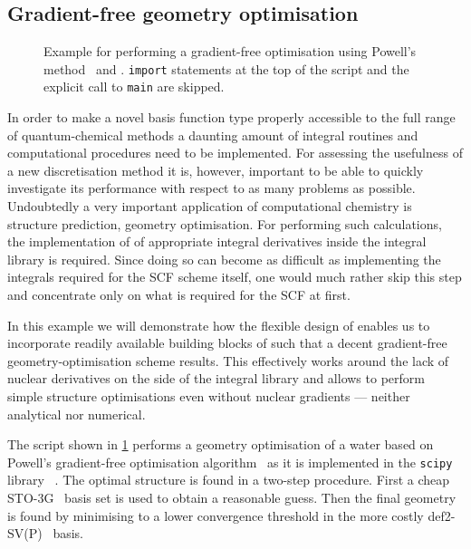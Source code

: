 \subsection{Gradient-free geometry optimisation}
\label{sec:ex:geo}

\begin{figure}
	
	\caption{
		Example for performing a gradient-free optimisation
		using Powell's method~\cite{Powell1964,Press1992} and \molsturm.
		\python \texttt{import} statements at the top of the script
		and the explicit call to \texttt{main} are skipped.
	}
	\label{fig:codeGeoOpt}
\end{figure}
\newcommand{\lgbasone}{36\xspace}
\newcommand{\lgbastwo}{41\xspace}

In order to make a novel basis function type properly accessible
to the full range of quantum-chemical methods
a daunting amount of integral routines and computational procedures
need to be implemented.
For assessing the usefulness of a new discretisation method it is, however,
important to be able to quickly investigate its performance with respect to
as many problems as possible.
Undoubtedly a very important application of computational chemistry
is structure prediction, \ie geometry optimisation.
For performing such calculations,
the implementation of of appropriate integral derivatives
inside the integral library is required.
Since doing so can become as difficult as implementing the integrals
required for the SCF scheme itself,
one would much rather skip this step and concentrate
only on what is required for the SCF at first.

In this example we will demonstrate how the flexible design of \molsturm
enables us to incorporate readily available building blocks of \python
such that a decent gradient-free geometry-optimisation scheme results.
This effectively works around the lack of nuclear derivatives
on the side of the integral library
and allows to perform simple structure optimisations
even without nuclear gradients --- neither analytical nor numerical.

The script shown in \fig \ref{fig:codeGeoOpt}
performs a geometry optimisation of a water
based on Powell's gradient-free optimisation algorithm~\cite{Powell1964,Press1992}
as it is implemented in the \texttt{scipy} library%
~\cite{Walt2011,scipyWeb}.
The optimal structure is found in a two-step procedure.
First a cheap \mbox{STO-3G}~\cite{Hehre1969} basis set is used to obtain
a reasonable guess.
Then the final geometry is found
by minimising to a lower convergence threshold in the more costly
\mbox{def2-SV(P)}~\cite{Weigend2005} basis.

